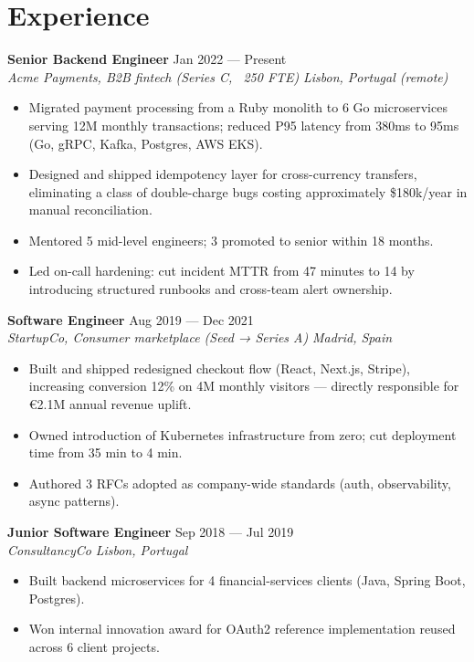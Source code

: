 \documentclass[a4paper,11pt]{article}
\newcommand{\role}[4]{%
  \noindent\textbf{#1} \hfill #3 \\
  \textit{#2} \hfill \textit{#4}
  \vspace{2pt}
}
\begin{document}
\section*{Experience}

\role{Senior Backend Engineer}{Acme Payments, B2B fintech (Series C, ~250 FTE)}{Jan 2022 — Present}{Lisbon, Portugal (remote)}
\begin{itemize}
  \item Migrated payment processing from a Ruby monolith to 6 Go microservices serving 12M monthly transactions; reduced P95 latency from 380ms to 95ms (Go, gRPC, Kafka, Postgres, AWS EKS).
  \item Designed and shipped idempotency layer for cross-currency transfers, eliminating a class of double-charge bugs costing approximately \$180k/year in manual reconciliation.
  \item Mentored 5 mid-level engineers; 3 promoted to senior within 18 months.
  \item Led on-call hardening: cut incident MTTR from 47 minutes to 14 by introducing structured runbooks and cross-team alert ownership.
\end{itemize}

\vspace{4pt}

\role{Software Engineer}{StartupCo, Consumer marketplace (Seed → Series A)}{Aug 2019 — Dec 2021}{Madrid, Spain}
\begin{itemize}
  \item Built and shipped redesigned checkout flow (React, Next.js, Stripe), increasing conversion 12\% on 4M monthly visitors — directly responsible for \euro2.1M annual revenue uplift.
  \item Owned introduction of Kubernetes infrastructure from zero; cut deployment time from 35 min to 4 min.
  \item Authored 3 RFCs adopted as company-wide standards (auth, observability, async patterns).
\end{itemize}

\vspace{4pt}

\role{Junior Software Engineer}{ConsultancyCo}{Sep 2018 — Jul 2019}{Lisbon, Portugal}
\begin{itemize}
  \item Built backend microservices for 4 financial-services clients (Java, Spring Boot, Postgres).
  \item Won internal innovation award for OAuth2 reference implementation reused across 6 client projects.
\end{itemize}
\end{document}
